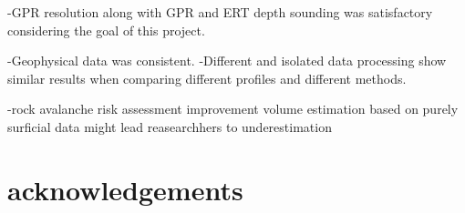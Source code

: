 \documentclass[5p]{elsarticle}
\begin{document}
-GPR resolution along with GPR and ERT depth sounding was satisfactory considering the goal of this project. 

-Geophysical data was consistent.
	-Different and isolated data processing show similar results when comparing different profiles and different methods. 


-rock avalanche risk assessment improvement 
	volume estimation based on purely surficial data might lead reasearchhers to underestimation


\section{acknowledgements}







\end{document}
